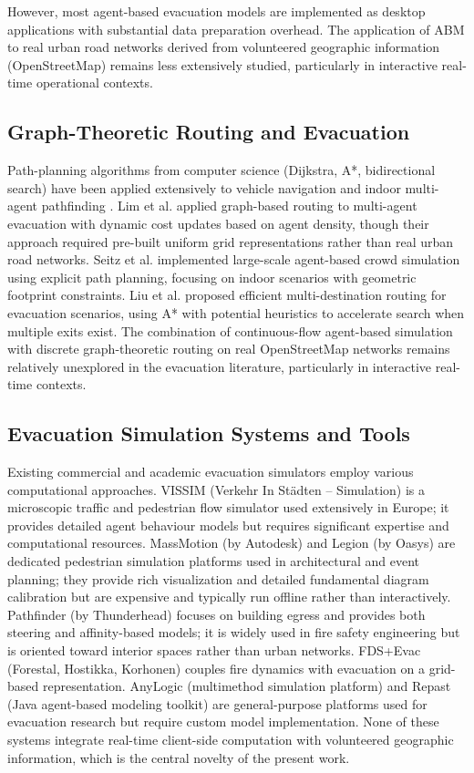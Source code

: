 \documentclass[conference]{IEEEtran}
\begin{document}
However, most agent-based evacuation models are implemented as desktop applications with substantial data preparation overhead. The application of ABM to real urban road networks derived from volunteered geographic information (OpenStreetMap) remains less extensively studied, particularly in interactive real-time operational contexts.

\subsection{Graph-Theoretic Routing and Evacuation}

Path-planning algorithms from computer science (Dijkstra, A*, bidirectional search) have been applied extensively to vehicle navigation and indoor multi-agent pathfinding \cite{hart1968formal, dijkstra1959shortest}. Lim et al. \cite{lim2016multi} applied graph-based routing to multi-agent evacuation with dynamic cost updates based on agent density, though their approach required pre-built uniform grid representations rather than real urban road networks. Seitz et al. \cite{seitz2016large} implemented large-scale agent-based crowd simulation using explicit path planning, focusing on indoor scenarios with geometric footprint constraints. Liu et al. \cite{liu2014efficient} proposed efficient multi-destination routing for evacuation scenarios, using A* with potential heuristics to accelerate search when multiple exits exist. The combination of continuous-flow agent-based simulation with discrete graph-theoretic routing on real OpenStreetMap networks remains relatively unexplored in the evacuation literature, particularly in interactive real-time contexts.

\subsection{Evacuation Simulation Systems and Tools}

Existing commercial and academic evacuation simulators employ various computational approaches. VISSIM (Verkehr In Städten – Simulation) \cite{fellendorf2010vissim} is a microscopic traffic and pedestrian flow simulator used extensively in Europe; it provides detailed agent behaviour models but requires significant expertise and computational resources. MassMotion (by Autodesk) and Legion (by Oasys) are dedicated pedestrian simulation platforms used in architectural and event planning; they provide rich visualization and detailed fundamental diagram calibration but are expensive and typically run offline rather than interactively. Pathfinder (by Thunderhead) focuses on building egress and provides both steering and affinity-based models; it is widely used in fire safety engineering but is oriented toward interior spaces rather than urban networks. FDS+Evac (Forestal, Hostikka, Korhonen) \cite{korhonen2008fds} couples fire dynamics with evacuation on a grid-based representation. AnyLogic (multimethod simulation platform) and Repast (Java agent-based modeling toolkit) are general-purpose platforms used for evacuation research but require custom model implementation. None of these systems integrate real-time client-side computation with volunteered geographic information, which is the central novelty of the present work.
\end{document}
